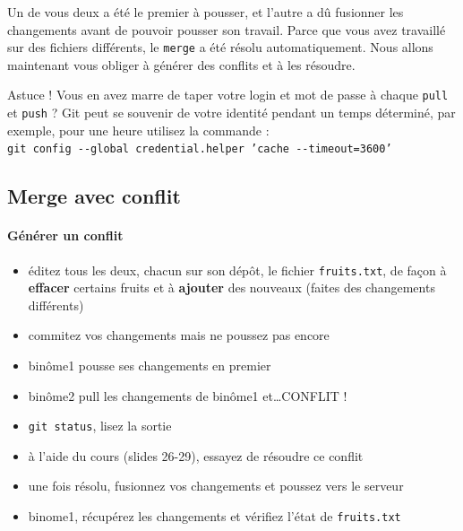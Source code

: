 \documentclass[final, a4paper, openbib, ]{article}
\begin{document}
Un de vous deux a été le premier à pousser, et l'autre a dû fusionner les changements avant de pouvoir pousser son travail.
Parce que vous avez travaillé sur des fichiers différents, le \texttt{merge} a été résolu automatiquement.
Nous allons maintenant vous obliger à générer des conflits et à les résoudre.

\begin{alertinfo3}{Astuce !}
Vous en avez marre de taper votre login et mot de passe à chaque \texttt{pull} et \texttt{push} ?
Git peut se souvenir de votre identité pendant un temps déterminé, par exemple, pour une heure utilisez la commande :\\
\texttt{git config \texttt{-}{}-global credential.helper 'cache \texttt{-}{}-timeout=3600'}
\end{alertinfo3}


\subsection{Merge avec conflit}

\paragraph{Générer un conflit}
\begin{itemize}
\item éditez tous les deux, chacun sur son dépôt, le fichier \texttt{fruits.txt}, de façon à \textbf{effacer} certains fruits et à \textbf{ajouter} des nouveaux (faites des changements différents)
\item commitez vos changements mais ne poussez pas encore
\item binôme1 pousse ses changements en premier
\item binôme2 pull les changements de binôme1 et\ldots CONFLIT !
\item \texttt{git status}, lisez la sortie
\item à l'aide du cours (slides 26-29), essayez de résoudre ce conflit
\item une fois résolu, fusionnez vos changements et poussez vers le serveur
\item binome1, récupérez les changements et vérifiez l'état de \texttt{fruits.txt}
\end{itemize}
\end{document}
